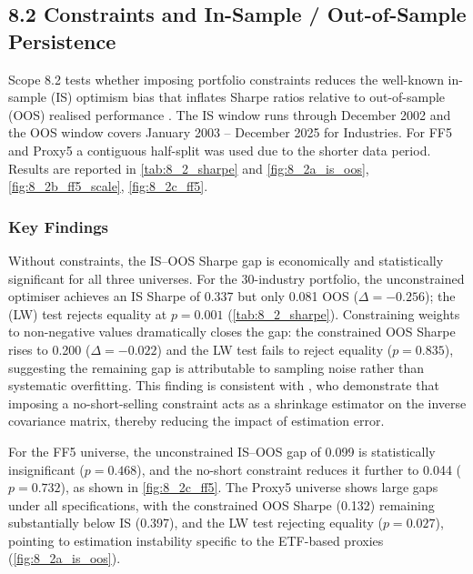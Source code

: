 \documentclass[11pt]{exam}
\begin{document}
\subsection{8.2 Constraints and In-Sample / Out-of-Sample Persistence}

\noindent Scope 8.2 tests whether imposing portfolio constraints reduces the well-known in-sample (IS) optimism bias that inflates Sharpe ratios relative to out-of-sample (OOS) realised performance \parencite{JobsonKorkie1981}. The IS window runs through December 2002 and the OOS window covers January 2003 -- December 2025 for Industries. For FF5 and Proxy5 a contiguous half-split was used due to the shorter data period. Results are reported in \autoref{tab:8_2_sharpe} and \autoref{fig:8_2a_is_oos}, \autoref{fig:8_2b_ff5_scale}, \autoref{fig:8_2c_ff5}.

\subsubsection*{Key Findings}

\noindent Without constraints, the IS--OOS Sharpe gap is economically and statistically significant for all three universes. For the 30-industry portfolio, the unconstrained optimiser achieves an IS Sharpe of 0.337 but only 0.081 OOS ($\Delta = -0.256$); the \cite{LedoitWolf2008} (LW) test rejects equality at $p = 0.001$ (\autoref{tab:8_2_sharpe}). Constraining weights to non-negative values dramatically closes the gap: the constrained OOS Sharpe rises to 0.200 ($\Delta = -0.022$) and the LW test fails to reject equality ($p = 0.835$), suggesting the remaining gap is attributable to sampling noise rather than systematic overfitting. This finding is consistent with \cite{jagannathan2003}, who demonstrate that imposing a no-short-selling constraint acts as a shrinkage estimator on the inverse covariance matrix, thereby reducing the impact of estimation error.

\noindent For the FF5 universe, the unconstrained IS--OOS gap of 0.099 is statistically insignificant ($p = 0.468$), and the no-short constraint reduces it further to 0.044 ($p = 0.732$), as shown in \autoref{fig:8_2c_ff5}. The Proxy5 universe shows large gaps under all specifications, with the constrained OOS Sharpe (0.132) remaining substantially below IS (0.397), and the LW test rejecting equality ($p = 0.027$), pointing to estimation instability specific to the ETF-based proxies (\autoref{fig:8_2a_is_oos}).
\end{document}
